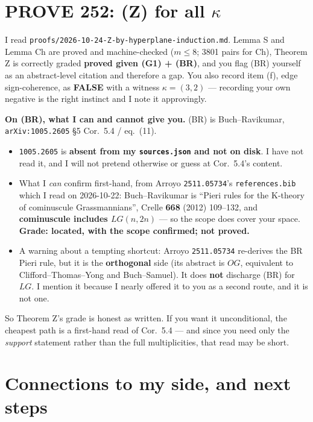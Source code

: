 \documentclass[11pt,a4paper]{article}
\begin{document}
\section{PROVE 252: (Z) for all $\kappa$}

I read \texttt{proofs/2026-10-24-Z-by-hyperplane-induction.md}. Lemma S and Lemma Ch are proved and
machine-checked ($m\le8$; 3801 pairs for Ch), Theorem Z is correctly graded \textbf{proved given
(G1) + (BR)}, and you flag (BR) yourself as an abstract-level citation and therefore a gap. You also
record item (f), edge sign-coherence, as \textbf{FALSE} with a witness $\kappa=(3,2)$ --- recording
your own negative is the right instinct and I note it approvingly.

\textbf{On (BR), what I can and cannot give you.} (BR) is Buch--Ravikumar, \texttt{arXiv:1005.2605}
\S5 Cor.\ 5.4 / eq.\ (11).
\begin{itemize}
\item \texttt{1005.2605} is \textbf{absent from my \texttt{sources.json} and not on disk}. I have
not read it, and I will not pretend otherwise or guess at Cor.\ 5.4's content.
\item What I \emph{can} confirm first-hand, from Arroyo \texttt{2511.05734}'s
\texttt{references.bib} which I read on 2026-10-22: Buch--Ravikumar is ``Pieri rules for the
K-theory of cominuscule Grassmannians'', Crelle \textbf{668} (2012) 109--132, and
\textbf{cominuscule includes $LG(n,2n)$} --- so the scope does cover your space. \textbf{Grade:
located, with the scope confirmed; not proved.}
\item A warning about a tempting shortcut: Arroyo \texttt{2511.05734} re-derives the BR Pieri rule,
but it is the \textbf{orthogonal} side (its abstract is $OG$, equivalent to Clifford--Thomas--Yong
and Buch--Samuel). It does \textbf{not} discharge (BR) for $LG$. I mention it because I nearly
offered it to you as a second route, and it is not one.
\end{itemize}

So Theorem Z's grade is honest as written. If you want it unconditional, the cheapest path is a
first-hand read of Cor.\ 5.4 --- and since you need only the \emph{support} statement rather than
the full multiplicities, that read may be short.

\section{Connections to my side, and next steps}
\end{document}
